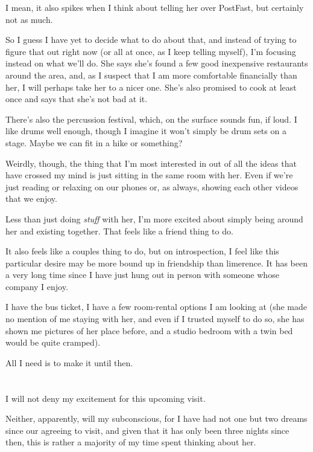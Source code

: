 I mean, it also spikes when I think about telling her over PostFast, but certainly not as much.

So I guess I have yet to decide what to do about that, and instead of trying to figure that out right now (or all at once, as I keep telling myself), I'm focusing instead on what we'll do. She says she's found a few good inexpensive restaurants around the area, and, as I suspect that I am more comfortable financially than her, I will perhaps take her to a nicer one. She's also promised to cook at least once and says that she's not bad at it.

There's also the percussion festival, which, on the surface sounds fun, if loud. I like drums well enough, though I imagine it won't simply be drum sets on a stage. Maybe we can fit in a hike or something?

Weirdly, though, the thing that I'm most interested in out of all the ideas that have crossed my mind is just sitting in the same room with her. Even if we're just reading or relaxing on our phones or, as always, showing each other videos that we enjoy.

Less than just doing \emph{stuff} with her, I'm more excited about simply being around her and existing together. That feels like a friend thing to do.

It also feels like a couples thing to do, but on introspection, I feel like this particular desire may be more bound up in friendship than limerence. It has been a very long time since I have just hung out in person with someone whose company I enjoy.

I have the bus ticket, I have a few room-rental options I am looking at (she made no mention of me staying with her, and even if I trusted myself to do so, she has shown me pictures of her place before, and a studio bedroom with a twin bed would be quite cramped).

All I need is to make it until then.

\section{}

I will not deny my excitement for this upcoming visit.

Neither, apparently, will my subconscious, for I have had not one but two dreams since our agreeing to visit, and given that it has only been three nights since then, this is rather a majority of my time spent thinking about her.

